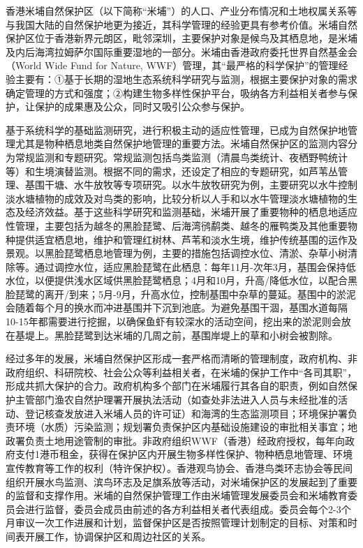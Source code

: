 \documentclass[]{book}
\begin{document}
香港米埔自然保护区（以下简称``米埔''）的人口、产业分布情况和土地权属关系等与我国大陆的自然保护地更为接近，其科学管理的经验更具有参考价值。米埔自然保护区位于香港新界元朗区，毗邻深圳，主要保护对象是候鸟及其栖息地，是米埔及内后海湾拉姆萨尔国际重要湿地的一部分。米埔由香港政府委托世界自然基金会（World Wide Fund for Nature, WWF）管理，其``最严格的科学保护''的管理经验主要有：①基于长期的湿地生态系统科学研究与监测，根据主要保护对象的需求确定管理的方式和强度；②构建生物多样性保护平台，吸纳各方利益相关者参与保护，让保护的成果惠及公众，同时又吸引公众参与保护。

基于系统科学的基础监测研究，进行积极主动的适应性管理，已成为自然保护地管理尤其是物种栖息地类自然保护地管理的重要方法。米埔自然保护区的监测内容分为常规监测和专题研究。常规监测包括鸟类监测（清晨鸟类统计、夜栖野鸭统计等）和生境演替监测。根据不同的需求，还设定了相应的专题研究，如芦苇丛管理、基围干塘、水牛放牧等专项研究。以水牛放牧研究为例，主要研究以水牛控制淡水塘植物的成效及对鸟类的影响，比较分析以人手和以水牛管理淡水塘植物的生态及经济效益。基于这些科学研究和监测基础，米埔开展了重要物种的栖息地适应性管理，主要包括为越冬的黑脸琵鹭、后海湾鸻鹬类、越冬的雁鸭类及其他重要物种提供适宜栖息地，维护和管理红树林、芦苇和淡水生境，维护传统基围的运作及景观。以黑脸琵鹭栖息地管理为例，主要的措施包括调控水位、清淤、杂草小树清除等。通过调控水位，适应黑脸琵鹭在此栖息：每年11月-次年3月，基围会保持低水位，以便提供浅水区域供黑脸琵鹭栖息；4月和10月，升高/降低水位，以配合黑脸琵鹭的离开/到来；5月-9月，升高水位，控制基围中杂草的蔓延。基围中的淤泥会随着每个月的换水而冲进基围并下沉到池底。为避免基围干涸，基围水道每隔10-15年都需要进行挖掘，以确保鱼虾有较深水的活动空间，挖出来的淤泥则会放在基堤上。黑脸琵鹭到达米埔的几周之前，基围岸堤上的草和小树会被割除。

经过多年的发展，米埔自然保护区形成一套严格而清晰的管理制度，政府机构、非政府组织、科研院校、社会公众等利益相关者，在米埔的保护工作中``各司其职''，形成共抓大保护的合力。政府机构多个部门在米埔履行其各自的职责，例如自然保护主管部门渔农自然护理署开展执法活动（如查处非法进入人员与未经批准的活动、登记核查发放进入米埔人员的许可证）和海湾的生态监测项目；环境保护署负责环境（水质）污染监测；规划署负责保护区内基础设施建设的审批相关事宜；地政署负责土地用途管制的审批。非政府组织WWF（香港）经政府授权，每年向政府支付1港币租金，获得在保护区内开展生物多样性保护、物种栖息地管理、环境宣传教育等工作的权利（特许保护权）。香港观鸟协会、香港鸟类环志协会等民间组织开展水鸟监测、滨鸟环志及足旗系放等活动，对米埔保护区的发展起到了重要的监督和支撑作用。米埔的自然保护管理工作由米埔管理发展委员会和米埔教育委员会进行监督，委员会成员由前述的各方利益相关者代表组成。委员会每个2-3个月审议一次工作进展和计划，监督保护区是否按照管理计划制定的目标、对策和时间表开展工作，协调保护区和周边社区的关系。
\end{document}
